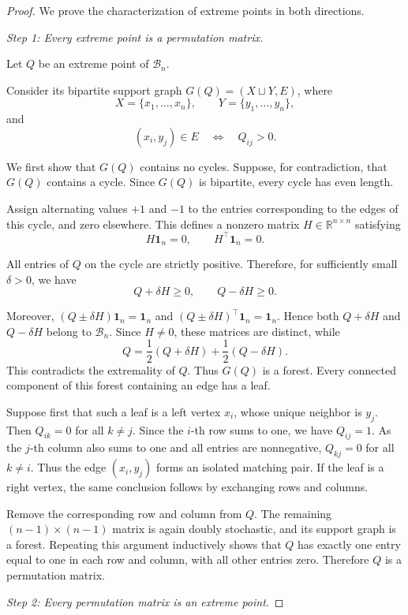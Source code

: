 \documentclass[11pt,a4paper]{article}
\theoremstyle{definition}
\begin{document}
\begin{proof}
We prove the characterization of extreme points in both directions.

\medskip
\noindent
\textit{Step 1: Every extreme point is a permutation matrix.}

Let $Q$ be an extreme point of $\mathcal{B}_n$.

Consider its bipartite support graph
$G(Q)=(X\sqcup Y,E)$, where
\[ X=\{x_1,\ldots,x_n\},\qquad Y=\{y_1,\ldots,y_n\},\]
and
\[(x_i,y_j)\in E\quad\Longleftrightarrow\quad Q_{ij}>0.\]

We first show that $G(Q)$ contains no cycles. Suppose, for contradiction, that
$G(Q)$ contains a cycle. Since $G(Q)$ is bipartite, every cycle has even length.

Assign alternating values $+1$ and $-1$ to the entries corresponding to the
edges of this cycle, and zero elsewhere. This defines a nonzero matrix
$H\in\mathbb{R}^{n\times n}$ satisfying
\[
H\mathbf{1}_n=0,\qquad H^\top\mathbf{1}_n=0.
\]

All entries of $Q$ on the cycle are strictly positive. Therefore, for sufficiently small
$\delta>0$, we have
\[Q+\delta H\geq 0,\qquad Q-\delta H\geq 0.\]

Moreover, $(Q\pm\delta H)\mathbf{1}_n=\mathbf{1}_n$ and
$(Q\pm\delta H)^\top\mathbf{1}_n=\mathbf{1}_n$.
Hence both $Q+\delta H$ and $Q-\delta H$ belong to $\mathcal{B}_n$.
Since $H\neq0$, these matrices are distinct, while
\[Q=\frac12(Q+\delta H)+\frac12(Q-\delta H).\]
This contradicts the extremality of $Q$. Thus $G(Q)$ is a forest.
Every connected component of this forest containing an edge has a leaf.

Suppose first that such a leaf is a left vertex $x_i$, whose unique neighbor is $y_j$.
Then $Q_{ik}=0$ for all $k\neq j$. Since the $i$-th row sums to one, we have $Q_{ij}=1$.
As the $j$-th column also sums to one and all entries are nonnegative, $Q_{kj}=0$ for all $k\neq i$.
Thus the edge $(x_i,y_j)$ forms an isolated matching pair.
If the leaf is a right vertex, the same conclusion follows by exchanging rows and columns.

Remove the corresponding row and column from $Q$. The remaining $(n-1)\times(n-1)$
matrix is again doubly stochastic, and its support graph is a forest.
Repeating this argument inductively shows that $Q$ has exactly one entry equal to one in each row
and column, with all other entries zero. Therefore $Q$ is a permutation matrix.

\medskip
\noindent
\textit{Step 2: Every permutation matrix is an extreme point.}


\end{proof}
\end{document}
